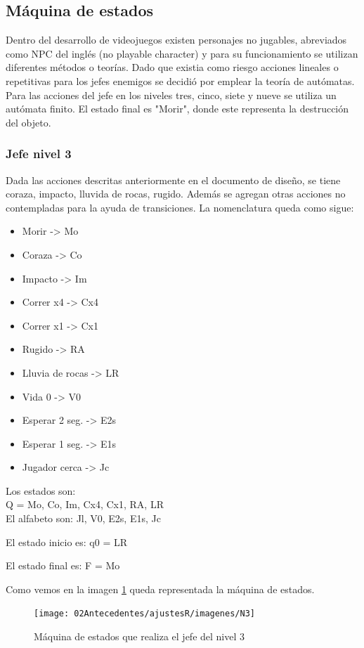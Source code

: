 \subsection{Máquina de estados}\label{maquinaEdos}
Dentro del desarrollo de videojuegos existen personajes no jugables, abreviados como NPC del inglés (no playable character) y para su funcionamiento se utilizan diferentes métodos o teorías.
Dado que existia como riesgo acciones lineales o repetitivas para los jefes enemigos se decidió por emplear la teoría de autómatas.
Para las acciones del jefe en los niveles tres, cinco, siete y nueve se utiliza un autómata finito. El estado final es "Morir", donde este representa la destrucción del objeto. 
	\\[1pt]
	
\subsubsection{Jefe nivel 3}
Dada las acciones descritas anteriormente en el documento de diseño, se tiene coraza, impacto, lluvida de rocas, rugido. Además se agregan otras acciones no contempladas para la ayuda de transiciones.
La nomenclatura queda como sigue:
	\\[1pt]
	
\begin{itemize}
	\item Morir -> Mo
	\item Coraza -> Co
	\item Impacto -> Im
	\item Correr x4 -> Cx4
	\item Correr x1 -> Cx1
	\item Rugido -> RA
	\item Lluvia de rocas -> LR
	\item Vida 0 -> V0
	\item Esperar 2 seg. -> E2s
	\item Esperar 1 seg. -> E1s
	\item Jugador cerca -> Jc
\end{itemize}

Los estados son:
	\\[1pt]
	Q = {Mo, Co, Im, Cx4, Cx1, RA, LR}
		\\[1pt]
		
El alfabeto son:
	{Jl, V0, E2s, E1s, Jc}
		
El estado inicio es:
	q0 = {LR}
		
El estado final es:
	F = {Mo}

Como vemos en la imagen \ref{fig:maqN3} queda representada la máquina de estados.
\begin{figure}
	\centering
	\caption{Máquina de estados que realiza el jefe del nivel 3}
	\label{fig:maqN3}
	\texttt{[image: 02Antecedentes/ajustesR/imagenes/N3]}
\end{figure}

